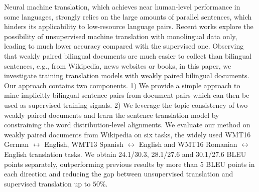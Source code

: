 Neural machine translation, which achieves near human-level performance in some languages, strongly relies on the large amounts of parallel sentences, which hinders its applicability to low-resource language pairs. Recent works explore the possibility of unsupervised machine translation with monolingual data only, leading to much lower accuracy compared with the supervised one. Observing that weakly paired bilingual documents are much easier to collect than bilingual sentences, e.g., from Wikipedia, news websites or books, in this paper, we investigate training translation models with weakly paired bilingual documents. Our approach contains two components. 1) We provide a simple approach to mine implicitly bilingual sentence pairs from document pairs which can then be used as supervised training signals. 2) We leverage the topic consistency of two weakly paired documents and learn the sentence translation model by constraining the word distribution-level alignments.  We evaluate our method on weakly paired documents from Wikipedia on six tasks, the widely used WMT16 German $\leftrightarrow$ English, WMT13 Spanish $\leftrightarrow$ English and WMT16 Romanian $\leftrightarrow$ English translation tasks. We obtain 24.1/30.3, 28.1/27.6 and 30.1/27.6 BLEU points separately, outperforming previous results by more than 5 BLEU points in each direction and reducing the gap between unsupervised translation and supervised translation up to $50\%$.